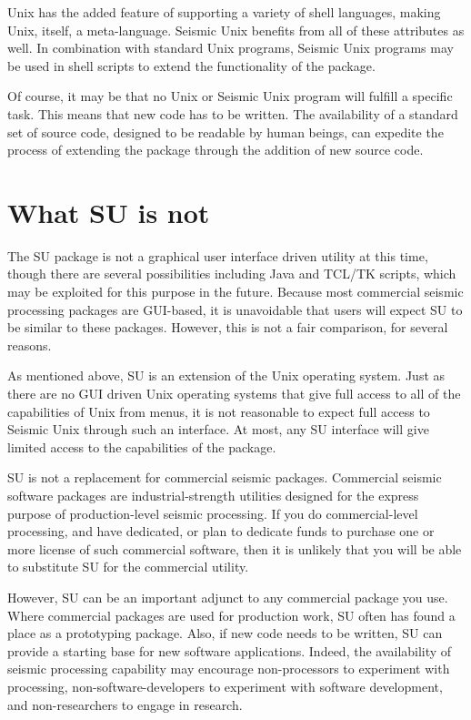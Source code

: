 Unix has the added feature of supporting a variety of shell languages,
making Unix, itself, a meta-language. Seismic Unix benefits from all
of these attributes as well. In combination with standard Unix
programs, Seismic Unix programs may be used in shell scripts to
extend the functionality of the package.

Of course, it may be that no Unix or Seismic Unix program will fulfill
a specific task. 
This means that new code has to be written.
The availability of a standard set of source code, designed
to be readable by human beings, can expedite the process of extending
the package through the addition of new source code.

\section{What SU is not}

The SU package is not a graphical user interface driven utility
at this time, though there are several possibilities including Java
and TCL/TK scripts, which may be exploited for this purpose in the future.
Because most commercial seismic processing packages are GUI-based,
it is unavoidable that users will expect SU to be similar to these
packages.
However, this is not a fair comparison, for several reasons. 

As mentioned above, SU is an extension of the Unix operating system.
Just as there are no GUI driven Unix operating systems that give full
access to all of the capabilities of Unix from menus, it is not 
reasonable to expect full access to Seismic Unix through such an 
interface.   At most, any SU interface will give limited access
to the capabilities of the package.

SU is not a replacement for commercial seismic packages. Commercial
seismic software packages are industrial-strength utilities designed
for the express purpose of production-level seismic processing.
If you do commercial-level processing, and have dedicated, or plan
to dedicate funds to purchase one or more license of such commercial
software, then it is unlikely that you will be able to substitute
SU for the commercial utility.

However, SU can be an important adjunct to any commercial package
you use. Where commercial packages are used for 
production work, SU often has found a place as a prototyping package. 
Also, if new code needs to be written, SU can provide a starting base
for new software applications.
Indeed, the availability of seismic processing capability may encourage
non-processors to experiment with processing, non-software-developers
to experiment with software development, and non-researchers to 
engage in research.

